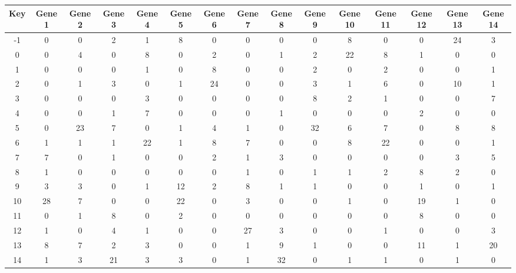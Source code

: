 \begin{tabular}{|c|c|c|c|c|c|c|c|c|c|c|c|c|c|c|}
\hline
Key & Gene 1 & Gene 2 & Gene 3 & Gene 4 & Gene 5 & Gene 6 & Gene 7 & Gene 8 & Gene 9 & Gene 10 & Gene 11 & Gene 12 & Gene 13 & Gene 14 \\
\hline
-1 & 0 & 0 & 2 & 1 & 8 & 0 & 0 & 0 & 0 & 8 & 0 & 0 & 24 & 3 \\
0 & 0 & 4 & 0 & 8 & 0 & 2 & 0 & 1 & 2 & 22 & 8 & 1 & 0 & 0 \\
1 & 0 & 0 & 0 & 1 & 0 & 8 & 0 & 0 & 2 & 0 & 2 & 0 & 0 & 1 \\
2 & 0 & 1 & 3 & 0 & 1 & 24 & 0 & 0 & 3 & 1 & 6 & 0 & 10 & 1 \\
3 & 0 & 0 & 0 & 3 & 0 & 0 & 0 & 0 & 8 & 2 & 1 & 0 & 0 & 7 \\
4 & 0 & 0 & 1 & 7 & 0 & 0 & 0 & 1 & 0 & 0 & 0 & 2 & 0 & 0 \\
5 & 0 & 23 & 7 & 0 & 1 & 4 & 1 & 0 & 32 & 6 & 7 & 0 & 8 & 8 \\
6 & 1 & 1 & 1 & 22 & 1 & 8 & 7 & 0 & 0 & 8 & 22 & 0 & 0 & 1 \\
7 & 7 & 0 & 1 & 0 & 0 & 2 & 1 & 3 & 0 & 0 & 0 & 0 & 3 & 5 \\
8 & 1 & 0 & 0 & 0 & 0 & 0 & 1 & 0 & 1 & 1 & 2 & 8 & 2 & 0 \\
9 & 3 & 3 & 0 & 1 & 12 & 2 & 8 & 1 & 1 & 0 & 0 & 1 & 0 & 1 \\
10 & 28 & 7 & 0 & 0 & 22 & 0 & 3 & 0 & 0 & 1 & 0 & 19 & 1 & 0 \\
11 & 0 & 1 & 8 & 0 & 2 & 0 & 0 & 0 & 0 & 0 & 0 & 8 & 0 & 0 \\
12 & 1 & 0 & 4 & 1 & 0 & 0 & 27 & 3 & 0 & 0 & 1 & 0 & 0 & 3 \\
13 & 8 & 7 & 2 & 3 & 0 & 0 & 1 & 9 & 1 & 0 & 0 & 11 & 1 & 20 \\
14 & 1 & 3 & 21 & 3 & 3 & 0 & 1 & 32 & 0 & 1 & 1 & 0 & 1 & 0 \\
\hline
\end{tabular}